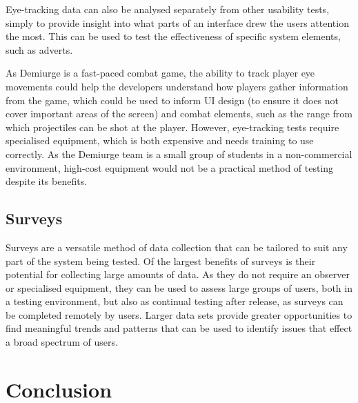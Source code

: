 \documentclass{scrartcl}
\begin{document}
Eye-tracking data can also be analysed separately from other usability tests, simply to provide insight into what parts of an interface drew the users attention the most. This can be used to test the effectiveness of specific system elements, such as adverts. 

As Demiurge is a fast-paced combat game, the ability to track player eye movements could help the developers understand how players gather information from the game, which could be used to inform UI design (to ensure it does not cover important areas of the screen) and combat elements, such as the range from which projectiles can be shot at the player. However, eye-tracking tests require specialised equipment, which is both expensive and needs training to use correctly. As the Demiurge team is a small group of students in a non-commercial environment, high-cost equipment would not be a practical method of testing despite its benefits.


\subsection{Surveys}
Surveys are a versatile method of data collection that can be tailored to suit any part of the system being tested. Of the largest benefits of surveys is their potential for collecting large amounts of data. As they do not require an observer or specialised equipment, they can be used to assess large groups of users, both in a testing environment, but also as continual testing after release, as surveys can be completed remotely by users. \cite{userExperience} Larger data sets provide greater opportunities to find meaningful trends and patterns that can be used to identify issues that effect a broad spectrum of users.




\section{Conclusion}





\end{document}

